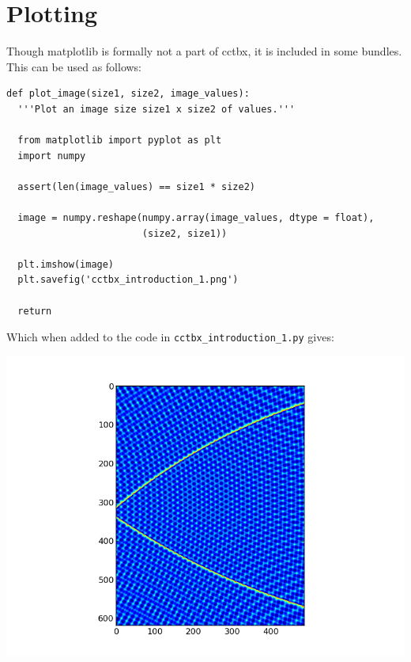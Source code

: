 \documentclass[a4paper, 11pt]{article}
\begin{document}
\section{Plotting}

Though matplotlib is formally not a part of cctbx, it is included in some bundles. This can be used as follows:

{\small
\begin{verbatim}
def plot_image(size1, size2, image_values):
  '''Plot an image size size1 x size2 of values.'''

  from matplotlib import pyplot as plt
  import numpy

  assert(len(image_values) == size1 * size2)

  image = numpy.reshape(numpy.array(image_values, dtype = float),
                        (size2, size1))

  plt.imshow(image)
  plt.savefig('cctbx_introduction_1.png')

  return
\end{verbatim}
}

\noindent
Which when added to the code in \verb|cctbx_introduction_1.py| gives:

\includegraphics[scale = 0.5]{cctbx_introduction_1.png}
\end{document}
